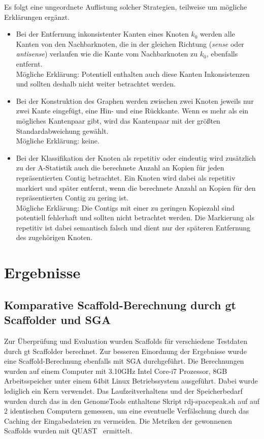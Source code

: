 \documentclass[a4paper,10pt,parskip]{scrartcl}
\begin{document}
Es folgt eine ungeordnete Auflistung solcher Strategien, teilweise um
mögliche Erklärungen ergänzt.
\begin{itemize}
\item Bei der Entfernung inkonsistenter Kanten eines Knoten $k_0$
  werden alle Kanten von den Nachbarknoten, die in der gleichen
  Richtung (\textit{sense} oder \textit{antisense}) verlaufen wie die
  Kante vom Nachbarknoten zu $k_0$, ebenfalls entfernt. \\
  Mögliche Erklärung: Potentiell enthalten auch diese Kanten
  Inkonsistenzen und sollten deshalb nicht weiter betrachtet werden.
\item Bei der Konstruktion des Graphen werden zwischen zwei Knoten
  jeweils nur zwei Kante eingefügt, eine Hin- und eine Rückkante.
  Wenn es mehr als ein mögliches Kantenpaar gibt, wird das Kantenpaar mit der
  größten Standardabweichung gewählt. \\
  Mögliche Erklärung: keine.
\item Bei der Klassifikation der Knoten als repetitiv oder eindeutig
  wird zusätzlich zu der A-Statistik auch die berechnete Anzahl an
  Kopien für jeden repräsentierten Contig betrachtet. Ein Knoten wird
  dabei als repetitiv markiert und später entfernt, wenn die
  berechnete Anzahl an Kopien für den repräsentierten Contig zu gering
  ist. \\
  Mögliche Erklärung: Die Contigs mit einer zu geringen
  Kopiezahl sind potentiell fehlerhaft und sollten nicht betrachtet
  werden. Die Markierung als repetitiv ist dabei semantisch falsch und
  dient nur der späteren Entfernung des zugehörigen Knoten.
\end{itemize}

\section{Ergebnisse}

\subsection{Komparative Scaffold-Berechnung durch gt Scaffolder und SGA}
Zur Überprüfung und Evaluation wurden Scaffolds für verschiedene Testdaten durch
gt Scaffolder berechnet. Zur besseren Einordnung der Ergebnisse wurde eine
Scaffold-Berechnung ebenfalls mit SGA durchgeführt. Die Berechnungen wurden auf
einem Computer mit 3.10GHz Intel Core-i7 Prozessor, 8GB Arbeitsspeicher unter
einem 64bit Linux Betriebssystem ausgeführt. Dabei wurde lediglich ein Kern
verwendet. Das Laufzeitverhaltens und der Speicherbedarf wurden durch das in den
GenomeTools enthaltene Skript rdj-spacepeak.sh auf auf 2 identischen Computern
gemessen, um eine eventuelle Verfälschung durch das
Caching der Eingabedateien zu vermeiden. Die Metriken der gewonnenen Scaffolds
wurden mit QUAST~\cite{Gurevich:2013je} ermittelt.
\end{document}
